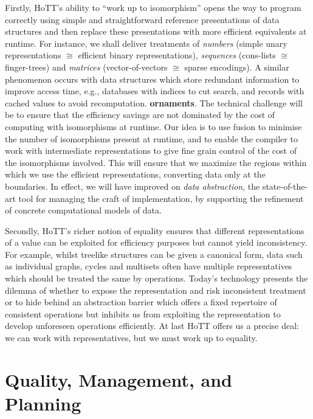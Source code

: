 \documentclass[a4paper,11pt]{article}
\begin{document}
Firstly, HoTT's ability to ``work up to isomorphism'' opens the way to
program correctly using simple and straightforward reference
presentations of data structures and then replace these presentations
with more efficient equivalents at runtime. For instance, we shall
deliver treatments of \emph{numbers} (simple unary representations $\cong$
efficient binary representations), \emph{sequences} (cons-lists $\cong$
finger-trees) and \emph{matrices} (vector-of-vectors $\cong$ sparse
encodings). %
A similar phenomenon occurs with data structures which store redundant
information to improve access time, e.g., databases with indices to
cut search, and records with cached values to avoid
recomputation. {\bf ornaments}. The technical challenge will be to
ensure that the efficiency savings are not dominated by the cost of
computing with isomorphisms at runtime. Our idea is to use fusion to
minimise the number of isomorphisms present at runtime, and to enable
the compiler to work with intermediate representations to give fine
grain control of the cost of the isomorphisms involved.  This will
ensure that we maximize the regions within which we use the efficient
representations, converting data only at the boundaries.  In effect,
we will have improved on \emph{data abstraction}, the state-of-the-art
tool for managing the craft of implementation, by supporting the
refinement of concrete computational models of data.

Secondly, HoTT's richer notion of equality ensures that different
representations of a value can be exploited for efficiency purposes
but cannot yield inconsistency. For example, whilst treelike
structures can be given a canonical form, data such as individual graphs, cycles
and multisets often have multiple representatives which should be
treated the same by operations. Today's technology presents the
dilemma of whether to expose the representation and risk inconsistent
treatment or to hide behind an abstraction barrier which offers a
fixed repertoire of consistent operations but inhibits us from
exploiting the representation to develop unforeseen operations
efficiently. At last HoTT offers us a precise deal: we can work with
representatives, but we must work up to equality. 

\section{Quality, Management, and Planning}
\end{document}
